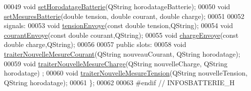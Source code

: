 \begin{DoxyCode}
00049     \textcolor{keywordtype}{void} \hyperlink{class_infos_batterie_a1d98a79696389d0264959d0c8a64bbcd}{setHorodatageBatterie}(QString horodatageBatterie);
00050     \textcolor{keywordtype}{void} \hyperlink{class_infos_batterie_ab1b2945b7d7c1a6207e29369690a27b9}{setMesuresBatterie}(\textcolor{keywordtype}{double} tension, \textcolor{keywordtype}{double} courant, \textcolor{keywordtype}{double} charge);
00051 
00052 signals:
00053     \textcolor{keywordtype}{void} \hyperlink{class_infos_batterie_a932a48aafb94e5289d775bb3305fdb74}{tensionEnvoye}(\textcolor{keyword}{const} \textcolor{keywordtype}{double} tension,QString);
00054     \textcolor{keywordtype}{void} \hyperlink{class_infos_batterie_a3b648bf48c796c64d90db29741889eb1}{courantEnvoye}(\textcolor{keyword}{const} \textcolor{keywordtype}{double} courant,QString);
00055     \textcolor{keywordtype}{void} \hyperlink{class_infos_batterie_a75ef2e971d86ae3b66a787d53e3d5c63}{chargeEnvoye}(\textcolor{keyword}{const} \textcolor{keywordtype}{double} charge,QString);
00056 
00057 \textcolor{keyword}{public} slots:
00058     \textcolor{keywordtype}{void} \hyperlink{class_infos_batterie_a7c127f1798ba279918b7b0783f9d23c4}{traiterNouvelleMesureCourant}(QString nouveauCourant, QString 
      horodatage);
00059     \textcolor{keywordtype}{void} \hyperlink{class_infos_batterie_a92c1afb1e022fe75cd7a0877d64e8d53}{traiterNouvelleMesureCharge}(QString nouvelleCharge, QString horodatage)
      ;
00060     \textcolor{keywordtype}{void} \hyperlink{class_infos_batterie_a8b1c1008d441b30f2cf38995fae3e0ca}{traiterNouvelleMesureTension}(QString nouvelleTension, QString 
      horodatage);
00061 \};
00062 
00063 \textcolor{preprocessor}{#endif // INFOSBATTERIE\_H}
\end{DoxyCode}

